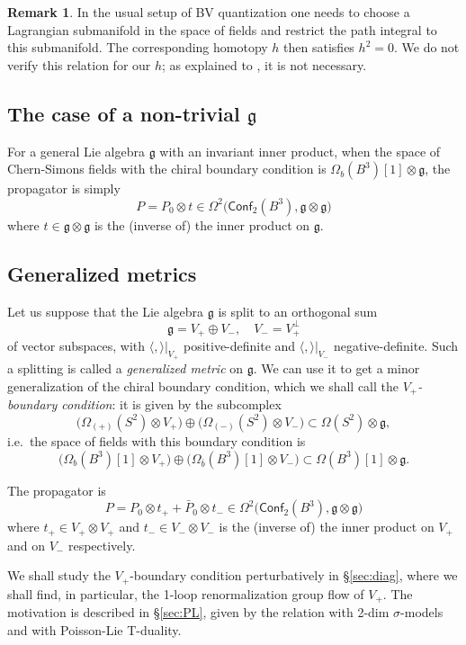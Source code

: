 \documentclass[a4paper]{amsart}
\theoremstyle{plain}
\theoremstyle{definition}
\newtheorem*{rem}{Remark}
\newcommand{\g}{\mathfrak{g}}
\newcommand{\la}{\langle}
\newcommand{\ra}{\rangle}
\newcommand{\cf}{\mathsf{Conf}}
\begin{document}
\begin{rem}
In the usual setup of BV quantization one needs to choose a Lagrangian submanifold in the space of fields and restrict the path integral to this submanifold. The corresponding homotopy $h$ then satisfies $h^2=0$. We do not verify this relation for our $h$; as explained to \cite{CM}, it is not necessary.
\end{rem}

\subsection{The case of a non-trivial $\g$}
For a general Lie algebra $\g$ with an invariant inner product, when the space of Chern-Simons fields with the chiral boundary condition is $\Omega_b(B^3)[1]\otimes\g$, the propagator is simply
$$P=P_0\otimes t\in \Omega^2\bigl(\cf_2(B^3),\g\otimes\g\bigr)$$
where $t\in\g\otimes\g$ is the (inverse of) the inner product on $\g$. 
\subsection{Generalized metrics}\label{sec:gm}
Let us suppose that the Lie algebra $\g$ is split to an orthogonal sum
$$\g=V_+\oplus V_-,\quad V_-=V_+^\perp$$
of vector subspaces, with $\la,\ra|_{V_+}$ positive-definite and $\la,\ra|_{V_-}$ negative-definite. Such a splitting is called a \emph{generalized metric} on $\g$. We can use it to get  a minor generalization of the chiral boundary condition, which we shall call the \emph{$V_+$-boundary condition}: it is given by the subcomplex
$$\bigl(\Omega_{(+)}(S^2)\otimes V_+\bigr) \oplus \bigl(\Omega_{(-)}(S^2)\otimes V_-\bigr) \subset\Omega(S^2)\otimes\g,$$
i.e.\ the  space of fields with this boundary condition is
$$\bigl(\Omega_{b}(B^3)[1]\otimes V_+\bigr) \oplus \bigl(\Omega_{\bar b}(B^3)[1]\otimes V_-\bigr)\subset \Omega(B^3)[1]\otimes\g.
$$

The propagator is
\begin{equation}\label{gmprop}
P=P_0\otimes t_+ + \bar P_0\otimes t_-\in \Omega^2\bigl(\cf_2(B^3),\g\otimes\g\bigr)
\end{equation}
where $t_+\in V_+\otimes V_+$ and $t_-\in V_-\otimes V_-$ is the (inverse of) the inner product on $V_+$ and on $V_-$ respectively.

We shall study the $V_+$-boundary condition perturbatively in \S\ref{sec:diag}, where we shall find, in particular, the 1-loop renormalization group flow of $V_+$. The motivation is described in \S\ref{sec:PL}, given by the relation with 2-dim $\sigma$-models and with Poisson-Lie T-duality.
\end{document}

